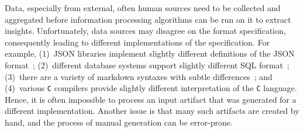 \documentclass[sigconf,review,anonymous]{acmart}
\def\<#1>{\texttt{#1}}
\newcounter{todocounter}
\newcommand{\todo}[1]{\marginpar{$|$}\textcolor{red}{\stepcounter{todocounter}\footnote[\thetodocounter]{\textcolor{red}{\textbf{TODO }}\textit{#1}}}}
\newcommand{\recheck}[1]{\textcolor{red}{#1}}
\renewcommand{\todo}[1]{}
\newcommand{\approach}{\textsc{BRepair}\xspace}
\begin{document}
\todo{remember to say the meaning or derivation of the name \approach}
Data, especially from external, often human sources need to be collected and
aggregated before information processing algorithms can be run on it to extract
insights. \todo{add concrete example use case} Unfortunately, data sources may disagree on the format specification, %
consequently leading to different %
implementations of the specification. %
For example, (1)~JSON libraries implement slightly different
definitions of the JSON format~\cite{harrand2021behavioral,seriot2016parsing};
(2)~different database systems support %
slightly different SQL format~\cite{arvin2018comparison}; (3)~there are a variety of markdown
syntaxes with subtle differences~\cite{visnoviz2019comparison}; and (4)~various
\<C> compilers %
provide slightly different interpretation of the \<C> language.
Hence, it is often impossible to process an input artifact that was generated for
a different implementation. %
Another issue is that many such artifacts
are created by hand, and the process of manual generation can be error-prone.
\end{document}
